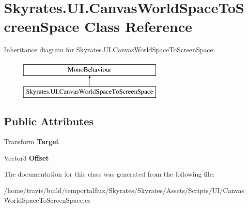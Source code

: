 \hypertarget{class_skyrates_1_1_u_i_1_1_canvas_world_space_to_screen_space}{\section{Skyrates.\-U\-I.\-Canvas\-World\-Space\-To\-Screen\-Space Class Reference}
\label{class_skyrates_1_1_u_i_1_1_canvas_world_space_to_screen_space}
}
Inheritance diagram for Skyrates.\-U\-I.\-Canvas\-World\-Space\-To\-Screen\-Space\-:\begin{figure}[H]
\begin{center}
\leavevmode
\includegraphics[height=2.000000cm]{class_skyrates_1_1_u_i_1_1_canvas_world_space_to_screen_space}
\end{center}
\end{figure}
\subsection*{Public Attributes}
\begin{DoxyCompactItemize}
\item 
\hypertarget{class_skyrates_1_1_u_i_1_1_canvas_world_space_to_screen_space_aecd06b087ab9e6173d75a98c6768ace2}{Transform {\bfseries Target}}\label{class_skyrates_1_1_u_i_1_1_canvas_world_space_to_screen_space_aecd06b087ab9e6173d75a98c6768ace2}

\item 
\hypertarget{class_skyrates_1_1_u_i_1_1_canvas_world_space_to_screen_space_ac841fdf8be75f77ef57f2a582916522b}{Vector3 {\bfseries Offset}}\label{class_skyrates_1_1_u_i_1_1_canvas_world_space_to_screen_space_ac841fdf8be75f77ef57f2a582916522b}

\end{DoxyCompactItemize}


The documentation for this class was generated from the following file\-:\begin{DoxyCompactItemize}
\item 
/home/travis/build/temportalflux/\-Skyrates/\-Skyrates/\-Assets/\-Scripts/\-U\-I/Canvas\-World\-Space\-To\-Screen\-Space.\-cs\end{DoxyCompactItemize}
